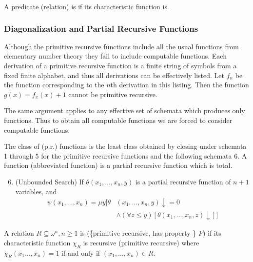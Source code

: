 \documentclass[11pt]{article}
\begin{document}
A predicate (relation) is  if its characteristic
function is.
\subsubsection{Diagonalization and Partial Recursive Functions}
\label{sec:org8515379}
Although the primitive recursive functions include all the usual functions
from elementary number theory they fail to include  computable
functions. Each derivation of a primitive recursive function is a finite
string of symbols from a fixed finite alphabet, and thus all derivations can
be effectively listed. Let \(f_n\) be the function corresponding to the \(n\)th
derivation in this listing. Then the function \(g(x)=f_x(x)+1\) cannot be
primitive recursive.

The same argument applies to any effective set of schemata which produces
only  functions. Thus to obtain all computable functions we are
forced to consider computable  functions.

\begin{definition}[Kleene]
The class of  (p.r.) functions is the least class
obtained by closing under schemata 1 through 5 for the primitive recursive
functions and the following schemata 6. A  function
(abbreviated  function) is a partial recursive function which
is total.
\begin{enumerate}
\setcounter{enumi}{5}
\item (Unbounded Search) If \(\theta(x_1,\dots,x_n,y)\) is a partial
recursive function of \(n+1\) variables, and 
\begin{align*}
\psi(x_1,\dots,x_n)=\mu y[\theta&(x_1,\dots,x_n,y)\downarrow=0\\
&\wedge (\forall z\le y)[\theta(x_1,\dots,x_n,z)\downarrow]]
\end{align*}
\end{enumerate}
\end{definition}
\begin{definition}[]
A relation \(R\subseteq \omega^n,n\ge 1\) is  (\tf\{primitive
recursive, has property \} \(P\)) if its characteristic function \(\chi_R\) is
recursive (primitive recursive) where \(\chi_R(x_1\dots,x_n)=1\) if and only if
\((x_1,\dots,x_n)\in R\).
\end{definition}
\end{document}
